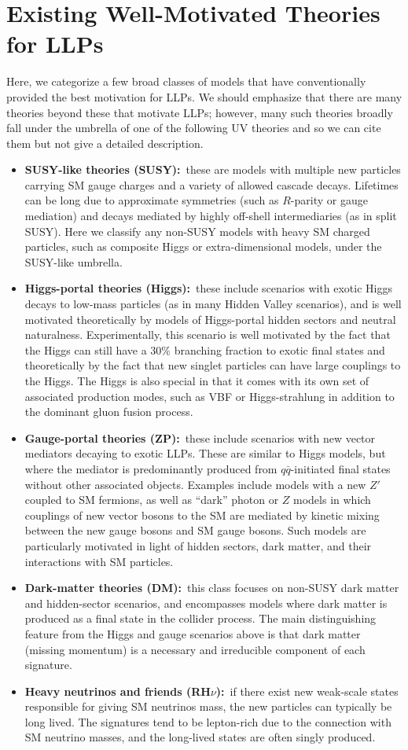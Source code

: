\section{Existing Well-Motivated Theories for LLPs}\label{sec:motivated_theories}
Here, we categorize a few broad classes of models that have conventionally provided the best motivation for LLPs. We should emphasize that there are many theories beyond these that motivate LLPs; however, many such theories broadly fall under the umbrella of one of the following UV theories and so we can cite them but not give a detailed description.
%
\begin{itemize}
\item {\bf SUSY-like theories (SUSY):}~these are models with multiple new particles carrying SM gauge charges and a variety of allowed cascade decays. Lifetimes can be long due to approximate symmetries (such as $R$-parity or gauge mediation) and decays mediated by highly off-shell intermediaries (as in split SUSY).  Here we classify any non-SUSY models with heavy SM charged particles, such as composite Higgs or extra-dimensional models, under the SUSY-like umbrella.
\item {\bf Higgs-portal theories (Higgs):}~these include scenarios with exotic Higgs decays to low-mass particles  (as in many Hidden Valley scenarios), and is well motivated theoretically by models of Higgs-portal hidden sectors and neutral naturalness. Experimentally, this scenario is well motivated by the fact that the Higgs can still have a 30\% branching fraction to exotic final states and theoretically by the fact that new singlet particles can have large couplings to the Higgs. The Higgs is also special in that it comes with its own set of associated production modes, such as VBF or Higgs-strahlung in addition to the dominant gluon fusion process.
\item {\bf Gauge-portal theories (ZP):}~these include scenarios with new vector mediators decaying to exotic LLPs. These are similar to Higgs models, but where the mediator is predominantly produced from $q\bar{q}$-initiated final states without other associated objects. Examples include models with a new $Z'$ coupled to SM fermions, as well as ``dark'' photon or $Z$ models in which couplings of new vector bosons to the SM are mediated by kinetic mixing between the new gauge bosons and SM gauge bosons. Such models are particularly motivated in light of hidden sectors, dark matter, and their interactions with SM particles.
\item {\bf Dark-matter theories (DM):}~this class focuses on non-SUSY dark matter and hidden-sector scenarios, and encompasses models where dark matter is produced as a final state in the collider process. The main distinguishing feature from the Higgs and gauge scenarios above is that dark matter (missing momentum) is a necessary and irreducible component of each signature.
\item {\bf Heavy neutrinos and friends (RH$\nu$):}~if there exist new weak-scale states responsible for giving SM neutrinos mass, the new particles can typically be long lived. The signatures tend to be lepton-rich due to the connection with SM neutrino masses, and the long-lived states are often singly produced.
\end{itemize}
